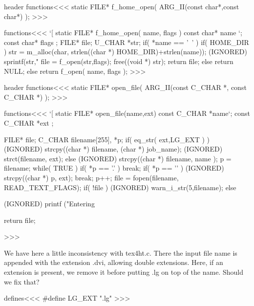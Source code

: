 {{{{{{\<header functions\><<<
static FILE* f_home_open( ARG_II(const char*,const char*) );
>>>

\<functions\><<<
`[
static FILE* f_home_open( name, flags ) 
                          const char*  name `;
                          const char*  flags                           
;{                        FILE* file;
                          U_CHAR *str;
  if( *name == '~' ){
     if( HOME_DIR ){ 
         str = m_alloc(char, strlen((char *) HOME_DIR)+strlen(name));
         (IGNORED) sprintf(str,"%
         file = f_open(str,flags);     
         free((void *)  str);
         return file;
     } else { return NULL; }
  } else {     return f_open( name, flags );   } 
}
>>>







\<header functions\><<<
static FILE* open_file( ARG_II(const C_CHAR *, const C_CHAR *) );
>>>

\<functions\><<<
`[
static FILE* open_file(name,ext)     
                         const C_CHAR *name`; const C_CHAR *ext
;{                       FILE* file;
                         C_CHAR filename[255], *p;
   if( eq_str( ext,LG_EXT ) ) { 
      (IGNORED) strcpy((char *) filename, (char *) job_name); 
      (IGNORED) strct(filename, ext); 
   } else {
      (IGNORED) strcpy((char *)  filename, name );   
      p = filename;
      while( TRUE ){
        if( *p == '.' ){  break; }
        if( *p == '\0' ){ (IGNORED) strcpy((char *) p, ext); break; }
        p++;
      }
   }
   file  = fopen(filename, READ_TEXT_FLAGS);  
   if( !file ) {
      (IGNORED) warn_i_str(5,filename);
   } else { (IGNORED) printf ("Entering %

   return file;
}
>>>


We have here a little inconsistency with tex4ht.c. There the input file
name is appended with the extension .dvi, allowing double extensions. 
Here, if an extension is present, we remove it before putting .lg on
top of the name. Should we fix that?




\<defines\><<<
#define LG_EXT ".lg"
>>>





% 
% 
% 
% 
% 



}}}}}}}
